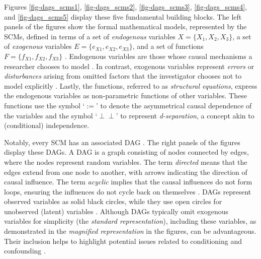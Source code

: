\documentclass[
  authoryear,
  review,
  1p]{elsarticle}
\begin{document}
Figures \ref{fig-dags_scms1}, \ref{fig-dags_scms2},
\ref{fig-dags_scms3}, \ref{fig-dags_scms4}, and \ref{fig-dags_scms5}
display these five fundamental building blocks. The left panels of the
figures show the formal mathematical models, represented by the SCMs,
defined in terms of a set of \emph{endogenous} variables
\(X=\{X_{1},X_{2},X_{3}\}\), a set of \emph{exogenous} variables
\(E=\{e_{X1},e_{X2},e_{X3}\}\), and a set of functions
\(F=\{f_{X1},f_{X2},f_{X3}\}\) \citep{Pearl_2009, Cinelli_et_al_2020}.
Endogenous variables are those whose causal mechanisms a researcher
chooses to model \citep{Neal_2020}. In contrast, exogenous variables
represent \emph{errors} or \emph{disturbances} arising from omitted
factors that the investigator chooses not to model explicitly
\citep[pp.~27,68]{Pearl_2009}. Lastly, the functions, referred to as
\emph{structural equations}, express the endogenous variables as
non-parametric functions of other variables. These functions use the
symbol `\(:=\)' to denote the asymmetrical causal dependence of the
variables and the symbol `\(\perp\!\!\!\perp\)' to represent
\emph{d-separation}, a concept akin to (conditional) independence.

Notably, every SCM has an associated DAG
\citep{Pearl_et_al_2016, Cinelli_et_al_2020}. The right panels of the
figures display these DAGs. A DAG is a graph consisting of nodes
connected by edges, where the nodes represent random variables. The term
\emph{directed} means that the edges extend from one node to another,
with arrows indicating the direction of causal influence. The term
\emph{acyclic} implies that the causal influences do not form loops,
ensuring the influences do not cycle back on themselves
\citep{McElreath_2020}. DAGs represent observed variables as solid black
circles, while they use open circles for unobserved (latent) variables
\citep{Morgan_et_al_2014}. Although DAGs typically omit exogenous
variables for simplicity (the \emph{standard representation}), including
these variables, as demonstrated in the \emph{magnified representation}
in the figures, can be advantageous. Their inclusion helps to highlight
potential issues related to conditioning and confounding
\citep{Cinelli_et_al_2020}.
\end{document}

